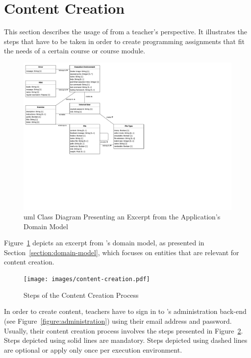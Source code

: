 \section{Content Creation}\label{section:content-creation}

This section describes the usage of \tool from a teacher's perspective. It illustrates the steps that have to be taken in order to create programming assignments that fit the needs of a certain course or course module.

\begin{figure}
\centering
\includegraphics[clip=true, trim=0.3cm 8.1cm 13.2cm 0.3cm, width=\textwidth]{images/domain-model2.pdf}
\caption{\gls{uml} Class Diagram Presenting an Excerpt from the Application’s Domain Model}
\label{figure:domain-model2}
\end{figure}

Figure~\ref{figure:domain-model2} depicts an excerpt from \tool's domain model, as presented in Section~\ref{section:domain-model}, which focuses on entities that are relevant for content creation.

\begin{figure}
\centering
\texttt{[image: images/content-creation.pdf]}
\caption{Steps of the Content Creation Process}
\label{figure:content-creation}
\end{figure}

In order to create content, teachers have to sign in to \tool's administration back-end (see Figure~\ref{figure:administration}) using their email address and password. Usually, their content creation process involves the steps presented in Figure~\ref{figure:content-creation}. Steps depicted using solid lines are mandatory. Steps depicted using dashed lines are optional or apply only once per execution environment.

